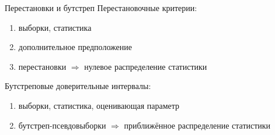 \documentclass[9pt,pdf,utf8,hyperref={unicode},aspectratio=169]{beamer}
\begin{document}
\begin{frame}{Перестановки и бутстреп}
	Перестановочные критерии:
	\begin{enumerate}
		\item выборки, статистика
		\item дополнительное предположение
		\item перестановки  $\Rightarrow$ нулевое распределение статистики
	\end{enumerate}	
	
	\bigskip	
	
	Бутстреповые доверительные интервалы:
	\begin{enumerate}
		\item выборки, статистика, оценивающая параметр
		\item бутстреп-псевдовыборки  $\Rightarrow$ приближённое распределение статистики
	\end{enumerate}	
\end{frame}
\end{document}
